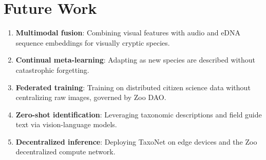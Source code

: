 \section{Future Work}

\label{sec:future}

\begin{enumerate}
  \item \textbf{Multimodal fusion}: Combining visual features with audio
    and eDNA sequence embeddings for visually cryptic species.
  \item \textbf{Continual meta-learning}: Adapting as new species are
    described without catastrophic forgetting.
  \item \textbf{Federated training}: Training on distributed citizen
    science data without centralizing raw images, governed by Zoo DAO.
  \item \textbf{Zero-shot identification}: Leveraging taxonomic
    descriptions and field guide text via vision-language models.
  \item \textbf{Decentralized inference}: Deploying TaxoNet on edge
    devices and the Zoo decentralized compute network.
\end{enumerate}


